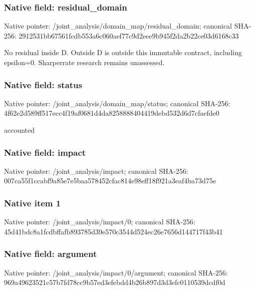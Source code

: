 \documentclass[10pt,a4paper]{article}
\begin{document}
\subsubsection{Native field: residual\_domain}


Native pointer: /joint\_analysis/domain\_m\allowbreak{}ap/residual\_domain; canonical SHA-256: 2912531bb67561fcdb553a6c\allowbreak{}060aef77c9d2eee9b945f2da\allowbreak{}2b22ce03d6168c33


No residual inside D. Outside D is outside this immutable contract, including epsilon=0. Sharperrate research remains unassessed.


\subsubsection{Native field: status}


Native pointer: /joint\_analysis/domain\_map/status; canonical SHA-256: 4f62e2d589ff517ecc4f19af\allowbreak{}0681d4da8258888404419deb\allowbreak{}d532d6d7cfaefde0


accounted


\subsubsection{Native field: impact}


Native pointer: /joint\_analysis/impact; canonical SHA-256: 007ca55f1ccabf9a85e7e5ba\allowbreak{}a578452cfac814e98eff18f9\allowbreak{}21a3eaf4ba73d75e



\subsubsection{Native item 1}


Native pointer: /joint\_analysis/impact/0; canonical SHA-256: 45d41bdc8a1fcdbffafb8937\allowbreak{}85d39e570c3544d524ec26e7\allowbreak{}656d144717f43b41



\subsubsection{Native field: argument}


Native pointer: /joint\_analysis/impact/0/argument; canonical SHA-256: 969a49623521c57b7fd78cc9\allowbreak{}b57ed3efebdd4b26b897d3d3\allowbreak{}efc0110539dcdf0d
\end{document}
